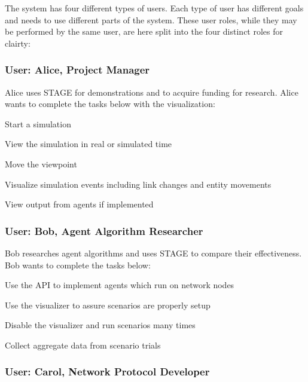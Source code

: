 \documentclass[titlepage]{article}
\begin{document}
The system has four different types of users.  Each type of user has different goals and needs to use different parts of the system.  These user roles, while they may be performed by the same user, are here split into the four distinct roles for clairty:


\subsubsection{User: Alice, Project Manager%
  \label{alice}%
}

Alice uses STAGE for demonstrations and to acquire funding for research.  Alice wants to complete the tasks below with
the visualization:

\begin{itemize*}
    \item Start a simulation
    \item View the simulation in real or simulated time
    \item Move the viewpoint
    \item Visualize simulation events including link changes and entity movements
    \item View output from agents if implemented
\end{itemize*}

\subsubsection{User: Bob, Agent Algorithm Researcher%
  \label{bob}%
}

Bob researches agent algorithms and uses STAGE to compare their effectiveness.  Bob wants to complete the tasks below:

\begin{itemize*}
    \item Use the API to implement agents which run on network nodes
    \item Use the visualizer to assure scenarios are properly setup
    \item Disable the visualizer and run scenarios many times
    \item Collect aggregate data from scenario trials
\end{itemize*}

\subsubsection{User: Carol, Network Protocol Developer%
  \label{bob}%
}
\end{document}
